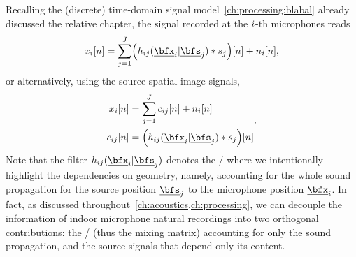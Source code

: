 
Recalling the (discrete) time-domain signal model~\cref{ch:processing:blabal} already discussed the relative chapter, the signal recorded at the $i$-th microphones reads
\begin{equation}
    \label{eq:application:stft}
    \mic_\idxMic[n] = \sum_{\idxSrc = 1}^{\numSrcs}
        \kparen{\flt_{\idxMicSrc}( \positionMicrophone_{\idxMic}  | \positionSource_{\idxSrc}) \convDis \src_{\idxSrc}} [n] + \nse_\idxMic[n]
    ,
\end{equation}
or alternatively, using the source spatial image signals,
\begin{equation}
    \label{eq:application:stft_img}
    \begin{aligned}
        \mic_\idxMic[n]     &= \sum_{\idxSrc = 1}^{\numSrcs} \img_{\idxMicSrc}[n] + \nse_\idxMic[n]\\
        \img_{\idxMicSrc}[n]  &= \kparen{\flt_{\idxMicSrc}( \positionMicrophone_{\idxMic}  | \positionSource_{\idxSrc}) \convDis \src_{\idxSrc}}[n]
    \end{aligned}
    ,
\end{equation}
Note that the filter $\flt_{\idxMicSrc}(\positionMicrophone_{\idxMic} | \positionSource_{\idxSrc})$ denotes the \RIR/ where we intentionally highlight the dependencies on geometry,
namely, accounting for the whole sound propagation for the source position $\positionSource_{\idxSrc}$ to the microphone position $\positionMicrophone_{\idxMic}$.
In fact, as discussed throughout~\cref{ch:acoustics,ch:processing}, we can decouple the information of indoor microphone natural recordings into two orthogonal contributions:
the \RIRs/ (thus the mixing matrix) accounting for only the sound propagation, and the source signals that depend only its content.

\newcommand{\setMicSignals}{\ensuremath{\set{\mic_{\idxMic}}_\idxMic}}
\newcommand{\setSrcSignals}{\ensuremath{\set{\src_{\idxSrc}}_\idxSrc}}
\newcommand{\setSrcPositions}{\ensuremath{\set{\positionSource_{\idxSrc}}_\idxSrc}}
\newcommand{\setFltSignals}{\ensuremath{\set{\flt_{\idxMicSrc}(\positionMicrophone_{\idxMic} | \positionSource_{\idxSrc})}_{\idxMicSrc}}}


